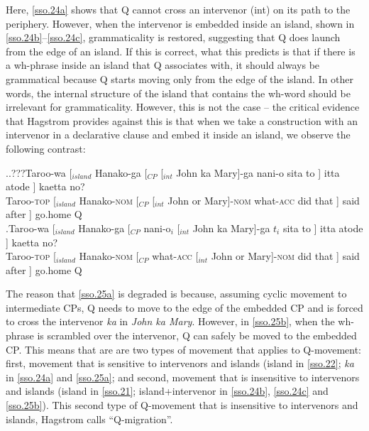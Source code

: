 \documentclass{glossa}
\begin{document}
Here, \ref{sso.24a} shows that Q cannot cross an intervenor (int) on its path to the periphery. However, when the intervenor is embedded inside an island, shown in \ref{sso.24b}--\ref{sso.24c}, grammaticality is restored, suggesting that Q does launch from the edge of an island. If this is correct, what this predicts is that if there is a wh-phrase inside an island that Q associates with, it should always be grammatical because Q starts moving only from the edge of the island. In other words, the internal structure of the island that contains the wh-word should be irrelevant for grammaticality. However, this is not the case -- the critical evidence that Hagstrom provides against this is that when we take a construction with an intervenor in a declarative clause and embed it inside an island, we observe the following contrast:

\ex.\ag.???\label{sso.25a}Taroo-wa [$_{island}$ Hanako-ga [$_{CP}$ [$_{int}$ John ka Mary]-ga nani-o sita to ] itta atode ] kaetta no?\\
   Taroo-\textsc{top} [$_{island}$ Hanako-\textsc{nom} [$_{CP}$ [$_{int}$ John or Mary]-\textsc{nom} what-\textsc{acc} did that ] said after ] go.home Q\\
   \bg.\label{sso.25b}Taroo-wa [$_{island}$ Hanako-ga [$_{CP}$ nani-o$_i$ [$_{int}$ John ka Mary]-ga $t_i$ sita to ] itta atode ] kaetta no?\\
   Taroo-\textsc{top} [$_{island}$ Hanako-\textsc{nom} [$_{CP}$ what-\textsc{acc} [$_{int}$ John or Mary]-\textsc{nom} {} did that ] said after ] go.home Q\\

The reason that \ref{sso.25a} is degraded is because, assuming cyclic movement to intermediate CPs, Q needs to move to the edge of the embedded CP and is forced to cross the intervenor \textit{ka} in \textit{John ka Mary}. However, in \ref{sso.25b}, when the wh-phrase is scrambled over the intervenor, Q can safely be moved to the embedded CP. This means that are are two types of movement that applies to Q-movement: first, movement that is sensitive to intervenors and islands (island in \ref{sso.22}; \textit{ka} in \ref{sso.24a} and \ref{sso.25a}; and second, movement that is insensitive to intervenors and islands (island in \ref{sso.21}; island+intervenor in \ref{sso.24b}, \ref{sso.24c} and \ref{sso.25b}). This second type of Q-movement that is insensitive to intervenors and islands, Hagstrom calls ``Q-migration''.
\end{document}
